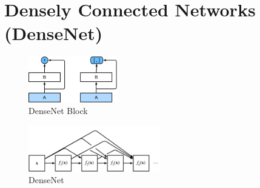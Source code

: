\section{Densely Connected Networks (DenseNet) \cite{dnn-1}} \label{Densely Connected Networks (DenseNet)}


\begin{table}[H]
    \begin{minipage}{0.48\linewidth}
        \begin{figure}[H]
            \centering
            \includegraphics[width=\linewidth, height=2cm, keepaspectratio]{Pictures/convolutional-neural-network/densenet-block.jpg}
            \caption{DenseNet Block}
        \end{figure}
    \end{minipage}
    \hfill
    \begin{minipage}{0.48\linewidth}
        \begin{figure}[H]
            \centering
            \includegraphics[width=\linewidth, height=2cm, keepaspectratio]{Pictures/convolutional-neural-network/densenet.jpg}
            \caption{DenseNet}
        \end{figure}
    \end{minipage}
\end{table}


